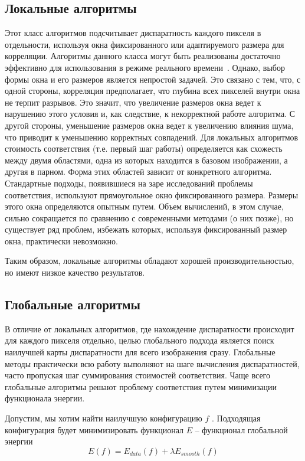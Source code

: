 \subsection{Локальные алгоритмы}
\label{local}

Этот класс алгоритмов подсчитывает диспаратность каждого пикселя в отдельности, используя окна фиксированного или адаптируемого размера для корреляции. 
Алгоритмы данного класса могут быть реализованы достаточно эффективно для использования в режиме реального времени~\cite{localhirsch}. 
Однако, выбор формы окна и его размеров является непростой задачей. Это связано с тем, что, с одной стороны,
корреляция предполагает, что глубина всех пикселей внутри окна не терпит разрывов. Это
значит, что увеличение размеров окна ведет к нарушению этого условия и, как следствие, к
некорректной работе алгоритма. С другой стороны, уменьшение размеров окна ведет к
увеличению влияния шума, что приводит к уменьшению корректных совпадений. Для
локальных алгоритмов стоимость соответствия (т.е. первый шаг работы) определяется как
схожесть между двумя областями, одна из которых находится в базовом изображении, а
другая в парном. Форма этих областей зависит от конкретного алгоритма. Стандартные
подходы, появившиеся на заре исследований проблемы соответствия, используют
прямоугольное окно фиксированного размера. Размеры этого окна определяются опытным
путем. Объем вычислений, в этом случае, сильно сокращается по сравнению с современными
методами (о них позже), но существует ряд проблем, избежать которых, используя
фиксированный размер окна, практически невозможно. 

Таким образом, локальные алгоритмы обладают хорошей производительностью, но имеют низкое качество результатов.

\subsection{Глобальные алгоритмы}
\label{global}
В отличие от локальных алгоритмов, где нахождение диспаратности происходит для каждого
пикселя отдельно, целью глобального подхода является поиск наилучшей карты
диспаратности для всего изображения сразу. Глобальные методы практически всю работу
выполняют на шаге вычисления диспаратностей, часто пропуская шаг суммирования
стоимостей соответствия. Чаще всего глобальные алгоритмы решают проблему соответствия
путем минимизации функционала энергии. 

Допустим, мы хотим найти наилучшую конфигурацию $f$ . Подходящая конфигурация
будет минимизировать функционал $E$ – функционал глобальной энергии 
$$ E(f) = E_{data}(f) + \lambda  E_{smooth}(f)$$

